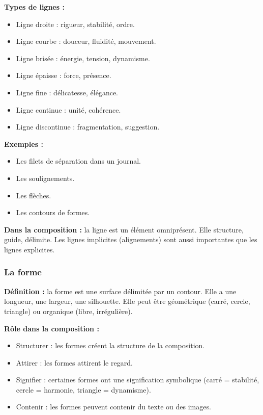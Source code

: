 \textbf{Types de lignes :}
\begin{itemize}
  \item Ligne droite : rigueur, stabilité, ordre.
  \item Ligne courbe : douceur, fluidité, mouvement.
  \item Ligne brisée : énergie, tension, dynamisme.
  \item Ligne épaisse : force, présence.
  \item Ligne fine : délicatesse, élégance.
  \item Ligne continue : unité, cohérence.
  \item Ligne discontinue : fragmentation, suggestion.
\end{itemize}

\textbf{Exemples :}
\begin{itemize}
  \item Les filets de séparation dans un journal.
  \item Les soulignements.
  \item Les flèches.
  \item Les contours de formes.
\end{itemize}

\textbf{Dans la composition :} la ligne est un élément omniprésent. Elle structure, guide, délimite. Les lignes implicites (alignements) sont aussi importantes que les lignes explicites.

\subsubsection{La forme}

\textbf{Définition :} la forme est une surface délimitée par un contour. Elle a une longueur, une largeur, une silhouette. Elle peut être géométrique (carré, cercle, triangle) ou organique (libre, irrégulière).

\textbf{Rôle dans la composition :}
\begin{itemize}
  \item Structurer : les formes créent la structure de la composition.
  \item Attirer : les formes attirent le regard.
  \item Signifier : certaines formes ont une signification symbolique (carré = stabilité, cercle = harmonie, triangle = dynamisme).
  \item Contenir : les formes peuvent contenir du texte ou des images.
\end{itemize}

